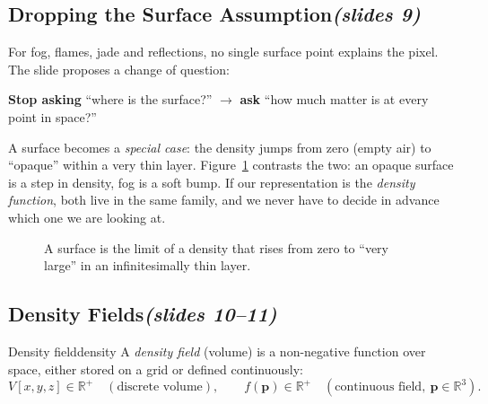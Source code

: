 \documentclass[11pt,a4paper]{article}
\newcommand{\slides}[1]{\texorpdfstring{\hfill{\normalfont\small\emph{(slides #1)}}}{ (slides #1)}}
\newcommand{\R}{\mathbb{R}}
\theoremstyle{remark}\newtheorem*{remark}{Remark}
\begin{document}
\subsection{Dropping the Surface Assumption\slides{9}}

For fog, flames, jade and reflections, no single surface point explains the pixel. The slide proposes a change of question:

\begin{center}
\textbf{Stop asking} ``where is the surface?'' \quad $\longrightarrow$ \quad \textbf{ask} ``how much matter is at every point in space?''
\end{center}

\begin{intuition}
A surface becomes a \emph{special case}: the density jumps from zero (empty air) to ``opaque'' within a very thin layer. Figure~\ref{fig:density} contrasts the two: an opaque surface is a step in density, fog is a soft bump. If our representation is the \emph{density function}, both live in the same family, and we never have to decide in advance which one we are looking at.
\end{intuition}

\begin{figure}[h]
\centering
{}
\caption{A surface is the limit of a density that rises from zero to ``very large'' in an infinitesimally thin layer.}\label{fig:density}
\end{figure}

\subsection{Density Fields\slides{10--11}}

\begin{definition}{Density field}{density}
A \emph{density field} (volume) is a non-negative function over space, either stored on a grid or defined continuously:
\[
V[x,y,z]\in\R^+ \quad (\text{discrete volume}),\qquad f(\mathbf p)\in\R^+ \quad (\text{continuous field},\ \mathbf p\in\R^3).
\]
\end{definition}
\end{document}
